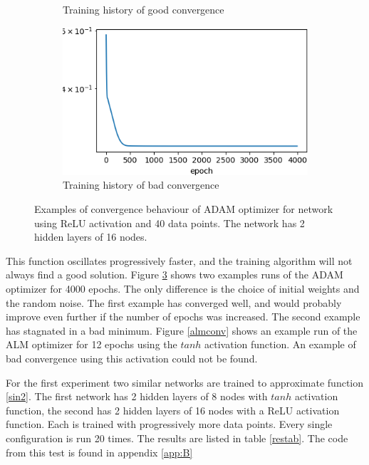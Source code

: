 \begin{figure}[p]
\begin{subfigure}[b]{0.49\textwidth}
         \caption{Training history of good convergence}
         \label{adamgoodconv}
     \end{subfigure}
     \begin{subfigure}[b]{0.49\textwidth}
         \centering
         \includegraphics[width=\textwidth]{adambadconv}
         \caption{Training history of bad convergence}
         \label{adambadconv}
     \end{subfigure}
    \caption{Examples of convergence behaviour of ADAM optimizer for network using ReLU activation and 40 data points. The network has 2 hidden layers of 16 nodes.}
    \label{adamconv}
\end{figure}

This function oscillates progressively faster, and the training algorithm will not always find a good solution. Figure \ref{adamconv} shows two examples runs of the ADAM optimizer for 4000 epochs. The only difference is the choice of initial weights and the random noise. The first example has converged well, and would probably improve even further if the number of epochs was increased. The second example has stagnated in a bad minimum. Figure \ref{almconv} shows an example run of the ALM optimizer for 12 epochs using the $tanh$ activation function. An example of bad convergence using this activation could not be found.

For the first experiment two similar networks are trained to approximate function \ref{sin2}. The first network has 2 hidden layers of 8 nodes with $tanh$ activation function, the second has 2 hidden layers of 16 nodes with a ReLU activation function. Each is trained with progressively more data points. Every single configuration is run 20 times. The results are listed in table \ref{restab}. The code from this test is found in appendix \ref{app:B}


